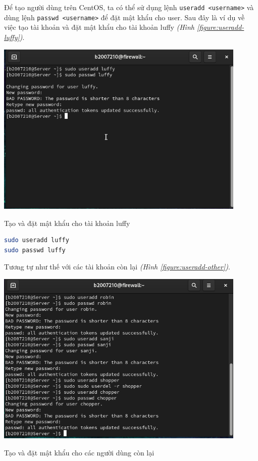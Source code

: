 \documentclass[a4paper, 11pt]{article}
\begin{document}
Để tạo người dùng trên CentOS, ta có thể sử dụng lệnh \texttt{useradd <username>} và dùng lệnh \texttt{passwd <username>} để đặt mật khẩu cho user.
Sau đây là ví dụ về việc tạo tài khoản và đặt mật khẩu cho tài khoản luffy \textit{(Hình \ref{figure:useradd-luffy})}.

\begin{minipage}
    {\linewidth}
    \captionsetup{type=figure}
    \centering
    \includegraphics[width=12cm]{images/useradd-luffy.png}
    \caption{Tạo và đặt mật khẩu cho tài khoản luffy}
    \label{figure:useradd-luffy}
\end{minipage}

\begin{lstlisting}[language=bash, caption=Tạo và đặt mật khẩu cho tài khoản luffy]
sudo useradd luffy
sudo passwd luffy
\end{lstlisting}

Tương tự như thế với các tài khoản còn lại \textit{(Hình \ref{figure:useradd-other})}.

\begin{minipage}
    {\linewidth}
    \captionsetup{type=figure}
    \centering
    \includegraphics[width=12cm]{images/useradd-other.png}
    \caption{Tạo và đặt mật khẩu cho các người dùng còn lại}
    \label{figure:useradd-other}
\end{minipage}
\end{document}
